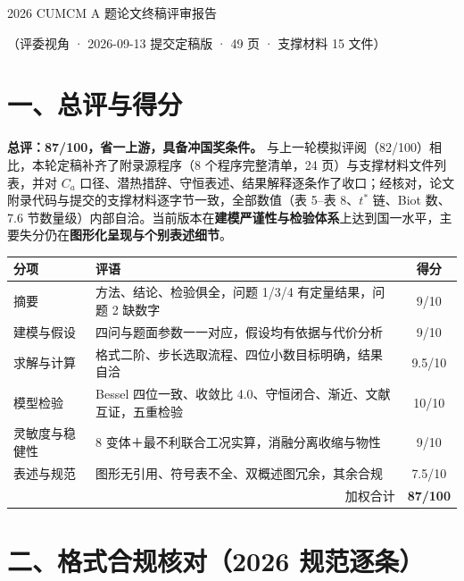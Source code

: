 \documentclass[12pt,a4paper]{ctexart}
\begin{document}
\begin{center}
{\heiti{} 2026 CUMCM A 题论文终稿评审报告\par}
\vspace{0.4em}
{ （评委视角 · 2026-09-13 提交定稿版 · 49 页 · 支撑材料 15 文件）\par}
\end{center}

\section{一、总评与得分}

\textbf{总评：87/100，省一上游，具备冲国奖条件。} 与上一轮模拟评阅（82/100）相比，本轮定稿补齐了附录源程序（8 个程序完整清单，24 页）与支撑材料文件列表，并对 $C_a$ 口径、潜热措辞、守恒表述、结果解释逐条作了收口；经核对，论文附录代码与提交的支撑材料逐字节一致，全部数值（表 5--表 8、$t^*$ 链、Biot 数、7.6 节数量级）内部自洽。当前版本在\textbf{建模严谨性与检验体系}上达到国一水平，主要失分仍在\textbf{图形化呈现与个别表述细节}。

\begin{center}
{\begin{tabular}{lp{9.5cm}c}
\toprule
分项 & 评语 & 得分 \\
\midrule
摘要 & 方法、结论、检验俱全，问题 1/3/4 有定量结果，问题 2 缺数字 & 9/10 \\
建模与假设 & 四问与题面参数一一对应，假设均有依据与代价分析 & 9/10 \\
求解与计算 & 格式二阶、步长选取流程、四位小数目标明确，结果自洽 & 9.5/10 \\
模型检验 & Bessel 四位一致、收敛比 4.0、守恒闭合、渐近、文献互证，五重检验 & 10/10 \\
灵敏度与稳健性 & 8 变体＋最不利联合工况实算，消融分离收缩与物性 & 9/10 \\
表述与规范 & 图形无引用、符号表不全、双概述图冗余，其余合规 & 7.5/10 \\
\bottomrule
\multicolumn{2}{r}{加权合计} & \textbf{87/100} \\
\bottomrule
\end{tabular}}
\end{center}

\section{二、格式合规核对（2026 规范逐条）}
\end{document}
